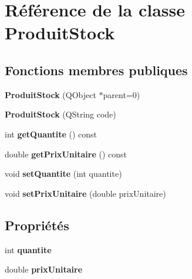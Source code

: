 \hypertarget{class_produit_stock}{
\section{Référence de la classe ProduitStock}
\label{d2/dc4/class_produit_stock}
}
\subsection*{Fonctions membres publiques}
\begin{DoxyCompactItemize}
\item 
\hypertarget{class_produit_stock_a689ab067e746885fe8c74b1065bdae60}{
{\bfseries ProduitStock} (QObject $\ast$parent=0)}
\label{d2/dc4/class_produit_stock_a689ab067e746885fe8c74b1065bdae60}

\item 
\hypertarget{class_produit_stock_ad535acc13f22959829fdb1221f9d74cc}{
{\bfseries ProduitStock} (QString code)}
\label{d2/dc4/class_produit_stock_ad535acc13f22959829fdb1221f9d74cc}

\item 
\hypertarget{class_produit_stock_a8c4fa4f9f829e4212060bdbcf555e7b6}{
int {\bfseries getQuantite} () const }
\label{d2/dc4/class_produit_stock_a8c4fa4f9f829e4212060bdbcf555e7b6}

\item 
\hypertarget{class_produit_stock_a6a6a3d513511860e63b75b1c333dfbaf}{
double {\bfseries getPrixUnitaire} () const }
\label{d2/dc4/class_produit_stock_a6a6a3d513511860e63b75b1c333dfbaf}

\item 
\hypertarget{class_produit_stock_af61f23add04996fb5ece3ca52c90b10b}{
void {\bfseries setQuantite} (int quantite)}
\label{d2/dc4/class_produit_stock_af61f23add04996fb5ece3ca52c90b10b}

\item 
\hypertarget{class_produit_stock_a6f25bef16f4f410bef0ea677afd1ea75}{
void {\bfseries setPrixUnitaire} (double prixUnitaire)}
\label{d2/dc4/class_produit_stock_a6f25bef16f4f410bef0ea677afd1ea75}

\end{DoxyCompactItemize}
\subsection*{Propriétés}
\begin{DoxyCompactItemize}
\item 
\hypertarget{class_produit_stock_a9517bc13bd5b4f149ff9bf1d9e8af0b8}{
int {\bfseries quantite}}
\label{d2/dc4/class_produit_stock_a9517bc13bd5b4f149ff9bf1d9e8af0b8}

\item 
\hypertarget{class_produit_stock_a1f7eb27df3c11200869864cb21a4bba2}{
double {\bfseries prixUnitaire}}
\label{d2/dc4/class_produit_stock_a1f7eb27df3c11200869864cb21a4bba2}

\end{DoxyCompactItemize}


